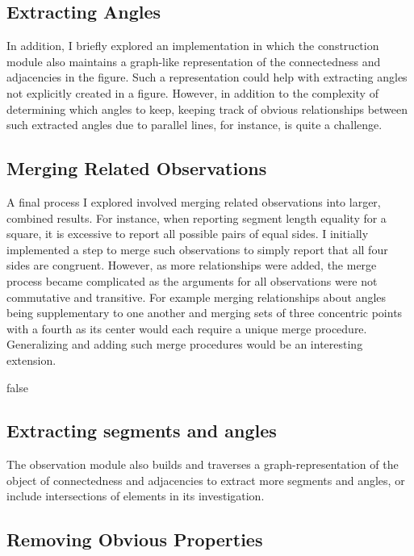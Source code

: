 \subsection{Extracting Angles}

In addition, I briefly explored an implementation in which the
construction module also maintains a graph-like representation of the
connectedness and adjacencies in the figure. Such a representation
could help with extracting angles not explicitly created in a
figure. However, in addition to the complexity of determining which
angles to keep, keeping track of obvious relationships between such
extracted angles due to parallel lines, for instance, is quite a
challenge.

\subsection{Merging Related Observations}

A final process I explored involved merging related observations into
larger, combined results. For instance, when reporting segment length
equality for a square, it is excessive to report all possible pairs of
equal sides. I initially implemented a step to merge such observations
to simply report that all four sides are congruent. However, as more
relationships were added, the merge process became complicated as the
arguments for all observations were not commutative and transitive.
For example merging relationships about angles being supplementary to
one another and merging sets of three concentric points with a fourth
as its center would each require a unique merge
procedure. Generalizing and adding such merge procedures would be an
interesting extension.


\if false

\subsection{Extracting segments and angles}

The observation module also builds and traverses a
graph-representation of the object of connectedness and adjacencies to
extract more segments and angles, or include intersections of elements
in its investigation.

\subsection{Removing Obvious Properties}

